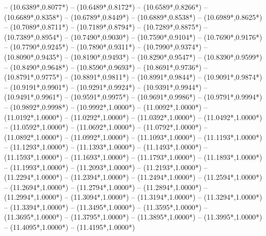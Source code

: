 {	-- ({10.6389*\dx},{0.8077*\dy})
	-- ({10.6489*\dx},{0.8172*\dy})
	-- ({10.6589*\dx},{0.8266*\dy})
	-- ({10.6689*\dx},{0.8358*\dy})
	-- ({10.6789*\dx},{0.8449*\dy})
	-- ({10.6889*\dx},{0.8538*\dy})
	-- ({10.6989*\dx},{0.8625*\dy})
	-- ({10.7089*\dx},{0.8711*\dy})
	-- ({10.7189*\dx},{0.8794*\dy})
	-- ({10.7289*\dx},{0.8875*\dy})
	-- ({10.7389*\dx},{0.8954*\dy})
	-- ({10.7490*\dx},{0.9030*\dy})
	-- ({10.7590*\dx},{0.9104*\dy})
	-- ({10.7690*\dx},{0.9176*\dy})
	-- ({10.7790*\dx},{0.9245*\dy})
	-- ({10.7890*\dx},{0.9311*\dy})
	-- ({10.7990*\dx},{0.9374*\dy})
	-- ({10.8090*\dx},{0.9435*\dy})
	-- ({10.8190*\dx},{0.9493*\dy})
	-- ({10.8290*\dx},{0.9547*\dy})
	-- ({10.8390*\dx},{0.9599*\dy})
	-- ({10.8490*\dx},{0.9648*\dy})
	-- ({10.8590*\dx},{0.9693*\dy})
	-- ({10.8691*\dx},{0.9736*\dy})
	-- ({10.8791*\dx},{0.9775*\dy})
	-- ({10.8891*\dx},{0.9811*\dy})
	-- ({10.8991*\dx},{0.9844*\dy})
	-- ({10.9091*\dx},{0.9874*\dy})
	-- ({10.9191*\dx},{0.9901*\dy})
	-- ({10.9291*\dx},{0.9924*\dy})
	-- ({10.9391*\dx},{0.9944*\dy})
	-- ({10.9491*\dx},{0.9961*\dy})
	-- ({10.9591*\dx},{0.9975*\dy})
	-- ({10.9691*\dx},{0.9986*\dy})
	-- ({10.9791*\dx},{0.9994*\dy})
	-- ({10.9892*\dx},{0.9998*\dy})
	-- ({10.9992*\dx},{1.0000*\dy})
	-- ({11.0092*\dx},{1.0000*\dy})
	-- ({11.0192*\dx},{1.0000*\dy})
	-- ({11.0292*\dx},{1.0000*\dy})
	-- ({11.0392*\dx},{1.0000*\dy})
	-- ({11.0492*\dx},{1.0000*\dy})
	-- ({11.0592*\dx},{1.0000*\dy})
	-- ({11.0692*\dx},{1.0000*\dy})
	-- ({11.0792*\dx},{1.0000*\dy})
	-- ({11.0892*\dx},{1.0000*\dy})
	-- ({11.0992*\dx},{1.0000*\dy})
	-- ({11.1093*\dx},{1.0000*\dy})
	-- ({11.1193*\dx},{1.0000*\dy})
	-- ({11.1293*\dx},{1.0000*\dy})
	-- ({11.1393*\dx},{1.0000*\dy})
	-- ({11.1493*\dx},{1.0000*\dy})
	-- ({11.1593*\dx},{1.0000*\dy})
	-- ({11.1693*\dx},{1.0000*\dy})
	-- ({11.1793*\dx},{1.0000*\dy})
	-- ({11.1893*\dx},{1.0000*\dy})
	-- ({11.1993*\dx},{1.0000*\dy})
	-- ({11.2093*\dx},{1.0000*\dy})
	-- ({11.2193*\dx},{1.0000*\dy})
	-- ({11.2294*\dx},{1.0000*\dy})
	-- ({11.2394*\dx},{1.0000*\dy})
	-- ({11.2494*\dx},{1.0000*\dy})
	-- ({11.2594*\dx},{1.0000*\dy})
	-- ({11.2694*\dx},{1.0000*\dy})
	-- ({11.2794*\dx},{1.0000*\dy})
	-- ({11.2894*\dx},{1.0000*\dy})
	-- ({11.2994*\dx},{1.0000*\dy})
	-- ({11.3094*\dx},{1.0000*\dy})
	-- ({11.3194*\dx},{1.0000*\dy})
	-- ({11.3294*\dx},{1.0000*\dy})
	-- ({11.3394*\dx},{1.0000*\dy})
	-- ({11.3495*\dx},{1.0000*\dy})
	-- ({11.3595*\dx},{1.0000*\dy})
	-- ({11.3695*\dx},{1.0000*\dy})
	-- ({11.3795*\dx},{1.0000*\dy})
	-- ({11.3895*\dx},{1.0000*\dy})
	-- ({11.3995*\dx},{1.0000*\dy})
	-- ({11.4095*\dx},{1.0000*\dy})
	-- ({11.4195*\dx},{1.0000*\dy})
}
